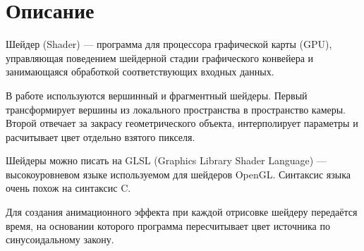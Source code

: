\section{Описание}
Шейдер (Shader) --- программа для процессора графической карты (GPU), управляющая поведением шейдерной стадии графического конвейера и занимающаяся обработкой соответствующих входных данных.

В работе используются вершинный и фрагментный шейдеры. Первый трансформирует вершины из локального пространства в пространство камеры. Второй отвечает за закрасу геометрического объекта, интерполирует параметры и расчитывает цвет отдельно взятого пикселя.

Шейдеры можно писать на GLSL (Graphics Library Shader Language) --- высокоуровневом языке используемом для шейдеров OpenGL. Синтаксис языка очень похож на синтаксис C.

Для создания анимационного эффекта при каждой отрисовке шейдеру передаётся время, на основании которого программа пересчитывает цвет источника по синусоидальному закону.
\pagebreak
